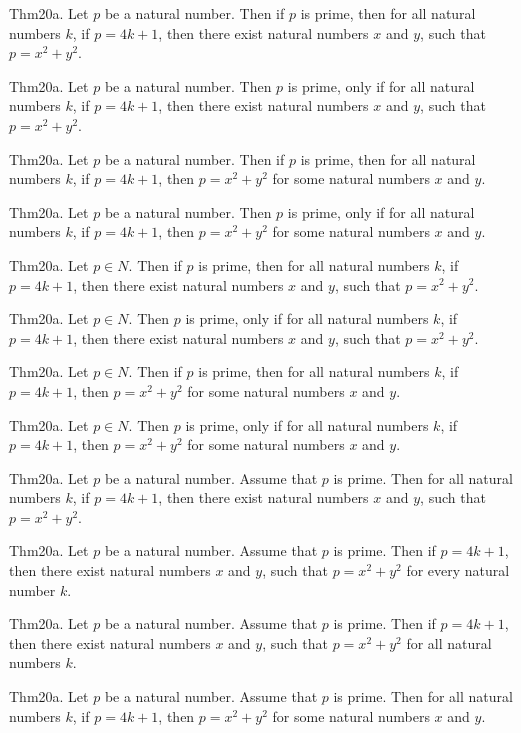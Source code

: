 \documentclass{article}
\begin{document}
Thm20a. Let $p$ be a natural number. Then if $p$ is prime, then for all natural numbers $k$, if $p = 4 k + 1$, then there exist natural numbers $x$ and $y$, such that $p = x ^{ 2}+ y ^{ 2}$.

Thm20a. Let $p$ be a natural number. Then $p$ is prime, only if for all natural numbers $k$, if $p = 4 k + 1$, then there exist natural numbers $x$ and $y$, such that $p = x ^{ 2}+ y ^{ 2}$.

Thm20a. Let $p$ be a natural number. Then if $p$ is prime, then for all natural numbers $k$, if $p = 4 k + 1$, then $p = x ^{ 2}+ y ^{ 2}$ for some natural numbers $x$ and $y$.

Thm20a. Let $p$ be a natural number. Then $p$ is prime, only if for all natural numbers $k$, if $p = 4 k + 1$, then $p = x ^{ 2}+ y ^{ 2}$ for some natural numbers $x$ and $y$.

Thm20a. Let $p \in N$. Then if $p$ is prime, then for all natural numbers $k$, if $p = 4 k + 1$, then there exist natural numbers $x$ and $y$, such that $p = x ^{ 2}+ y ^{ 2}$.

Thm20a. Let $p \in N$. Then $p$ is prime, only if for all natural numbers $k$, if $p = 4 k + 1$, then there exist natural numbers $x$ and $y$, such that $p = x ^{ 2}+ y ^{ 2}$.

Thm20a. Let $p \in N$. Then if $p$ is prime, then for all natural numbers $k$, if $p = 4 k + 1$, then $p = x ^{ 2}+ y ^{ 2}$ for some natural numbers $x$ and $y$.

Thm20a. Let $p \in N$. Then $p$ is prime, only if for all natural numbers $k$, if $p = 4 k + 1$, then $p = x ^{ 2}+ y ^{ 2}$ for some natural numbers $x$ and $y$.

Thm20a. Let $p$ be a natural number. Assume that $p$ is prime. Then for all natural numbers $k$, if $p = 4 k + 1$, then there exist natural numbers $x$ and $y$, such that $p = x ^{ 2}+ y ^{ 2}$.

Thm20a. Let $p$ be a natural number. Assume that $p$ is prime. Then if $p = 4 k + 1$, then there exist natural numbers $x$ and $y$, such that $p = x ^{ 2}+ y ^{ 2}$ for every natural number $k$.

Thm20a. Let $p$ be a natural number. Assume that $p$ is prime. Then if $p = 4 k + 1$, then there exist natural numbers $x$ and $y$, such that $p = x ^{ 2}+ y ^{ 2}$ for all natural numbers $k$.

Thm20a. Let $p$ be a natural number. Assume that $p$ is prime. Then for all natural numbers $k$, if $p = 4 k + 1$, then $p = x ^{ 2}+ y ^{ 2}$ for some natural numbers $x$ and $y$.
\end{document}
